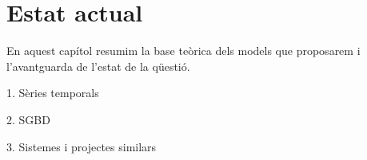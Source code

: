\chapter{Estat actual} 
\label{cap:estat}




En aquest capítol resumim la base teòrica dels models que proposarem i l'avantguarda de l'estat de la qüestió. 


1. Sèries temporals

2. \gls{SGBD}

3. Sistemes i projectes similars













  










